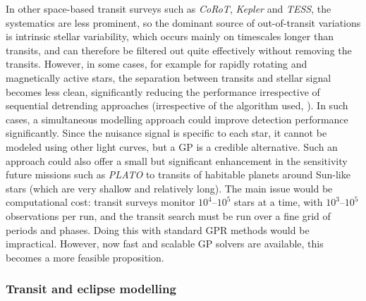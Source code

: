 \documentclass[letterpaper]{ar-1col}
\begin{document}
In other space-based transit surveys such as \textit{CoRoT}, \emph{Kepler} and \emph{TESS}, the systematics are less prominent, so the dominant source of out-of-transit variations is intrinsic stellar variability, which occurs mainly on timescales longer than transits, and can therefore be filtered out quite effectively without removing the transits. However, in some cases, for example for rapidly rotating and magnetically active stars, the separation between transits and stellar signal becomes less clean, significantly reducing the performance irrespective of sequential detrending approaches (irrespective of the algorithm used, \citealt{wotan}).
In such cases, a simultaneous modelling approach could improve detection performance significantly. Since the nuisance signal is specific to each star, it cannot be modeled using other light curves, but a GP is a credible alternative. Such an approach could also offer a small but significant enhancement in the sensitivity future missions such as \textit{PLATO} to transits of habitable planets around Sun-like stars (which are very shallow and relatively long). The main issue would be computational cost: transit surveys monitor $10^4$--$10^5$ stars at a time, with $10^3$--$10^5$ observations per run, and the transit search must be run over a fine grid of periods and phases. Doing this with standard GPR methods would be impractical. However, now fast and scalable GP solvers are available, this becomes a more feasible proposition.

\subsubsection{Transit and eclipse modelling}
\end{document}
